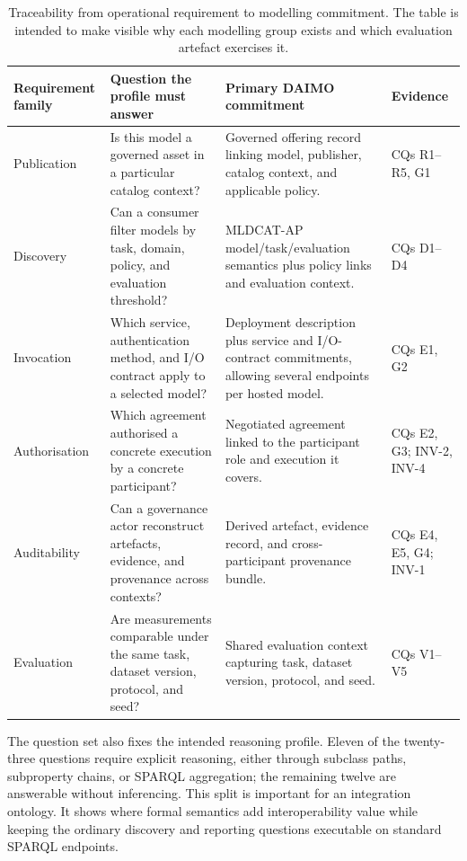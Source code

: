 \documentclass[11pt,a4paper]{article}
\begin{document}
\begin{table}[t]
\small\sf\centering
\caption{Traceability from operational requirement to modelling commitment. The table is intended to make visible why each modelling group exists and which evaluation artefact exercises it.\label{tab:req-trace}}
\begin{tabular}{@{}p{3.2cm}p{4.3cm}p{4.2cm}p{2.8cm}@{}}
\toprule
\textbf{Requirement family} & \textbf{Question the profile must answer} & \textbf{Primary DAIMO commitment} & \textbf{Evidence} \\
\midrule
Publication & Is this model a governed asset in a particular catalog context? & Governed offering record linking model, publisher, catalog context, and applicable policy. & CQs R1--R5, G1 \\
Discovery & Can a consumer filter models by task, domain, policy, and evaluation threshold? & MLDCAT-AP model/task/evaluation semantics plus policy links and evaluation context. & CQs D1--D4 \\
Invocation & Which service, authentication method, and I/O contract apply to a selected model? & Deployment description plus service and I/O-contract commitments, allowing several endpoints per hosted model. & CQs E1, G2 \\
Authorisation & Which agreement authorised a concrete execution by a concrete participant? & Negotiated agreement linked to the participant role and execution it covers. & CQs E2, G3; INV-2, INV-4 \\
Auditability & Can a governance actor reconstruct artefacts, evidence, and provenance across contexts? & Derived artefact, evidence record, and cross-participant provenance bundle. & CQs E4, E5, G4; INV-1 \\
Evaluation & Are measurements comparable under the same task, dataset version, protocol, and seed? & Shared evaluation context capturing task, dataset version, protocol, and seed. & CQs V1--V5 \\
\bottomrule
\end{tabular}
\end{table}

The question set also fixes the intended reasoning profile. Eleven of the twenty-three questions require explicit reasoning, either through subclass paths, subproperty chains, or SPARQL aggregation; the remaining twelve are answerable without inferencing. This split is important for an integration ontology. It shows where formal semantics add interoperability value while keeping the ordinary discovery and reporting questions executable on standard SPARQL endpoints.
\end{document}
